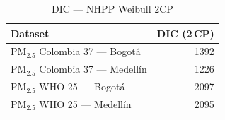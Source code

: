 \begin{table}[htbp]
\centering
\caption{DIC --- NHPP Weibull 2CP}
\label{tab:nhpp_dic_2cp}
\begin{tabular}{lr}
\toprule
Dataset & DIC (2\,CP) \\
\midrule
PM$_{2.5}$ Colombia 37 --- Bogot\'{a} & 1392 \\
PM$_{2.5}$ Colombia 37 --- Medell\'{i}n & 1226 \\
PM$_{2.5}$ WHO 25 --- Bogot\'{a} & 2097 \\
PM$_{2.5}$ WHO 25 --- Medell\'{i}n & 2095 \\
\bottomrule
\end{tabular}
\end{table}
